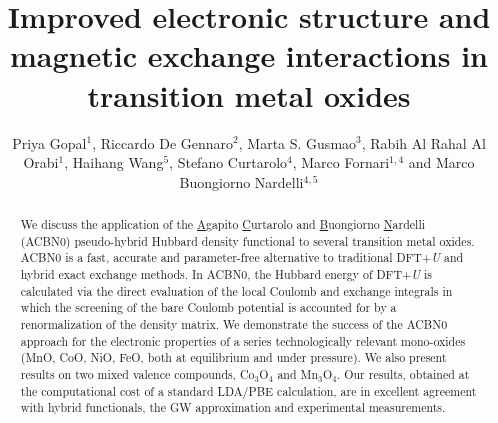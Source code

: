 \documentclass[12pt,a4paper,final]{iopart}
\begin{document}
\title[]{Improved electronic structure and magnetic exchange interactions in transition metal oxides}

\author{Priya Gopal$^{1}$, Riccardo De Gennaro$^{2}$, Marta S. Gusmao$^{3}$, Rabih Al Rahal Al Orabi$^{1}$,  Haihang Wang$^{5}$, Stefano Curtarolo$^{4}$, Marco Fornari$^{1,4}$ and Marco Buongiorno Nardelli$^{4,5}$}

\address{$^{1}$ Department of Physics, Central Michigan University, Mt. Pleasant, MI 48859 }
\address{$^{2}$ Dipartimento di Fisica, Universit\`a� di Roma Tor Vergata, Via della Ricerca Scientifica 1, 00133 Roma, Italy}
\address{$^{3}$Department of Physics, Federal University of Amazonas, Manaus, Amazonas, Brazil}
\address{$^{4}$ Center for Materials Genomics, Duke University, Durham, NC 27708, USA}
\address{$^{5}$ Department of Physics, University of North Texas, Denton, TX 76203, USA}
\vspace{10pt}
\begin{indented}
\item[]
\end{indented}

\begin{abstract}
We discuss the application of the \underline{A}gapito \underline{C}urtarolo  and \underline{B}uongiorno \underline{N}ardelli (ACBN0) pseudo-hybrid Hubbard density functional to several transition metal oxides. ACBN0 is a fast, accurate and parameter-free alternative to traditional DFT+\textit{U} and hybrid exact exchange methods. In ACBN0, the Hubbard energy of DFT+\textit{U} is calculated via the direct evaluation of the local Coulomb and exchange integrals in which the screening of the bare Coulomb potential is accounted for by a renormalization of the density matrix. 
We demonstrate the success of the ACBN0 approach for the electronic properties of a series technologically relevant mono-oxides  (MnO, CoO, NiO, FeO, both at equilibrium and under pressure). We also present results on two mixed valence compounds, Co$_3$O$_4$ and Mn$_3$O$_4$. Our results, obtained at the computational cost of a standard  LDA/PBE calculation, are in excellent agreement with hybrid functionals, the GW approximation and experimental measurements.

%
%
%
% 
%

\end{abstract}
\end{document}
